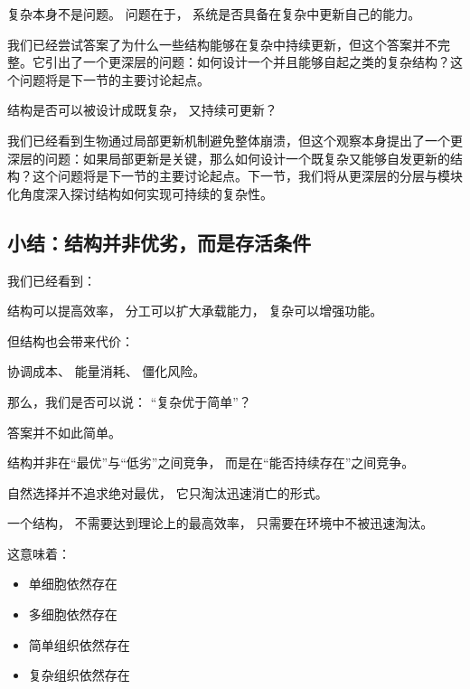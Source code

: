 \documentclass[openany, a4paper, 12pt]{book}
\begin{document}
\begin{readingnote}
	复杂本身不是问题。
	问题在于，
	系统是否具备在复杂中更新自己的能力。
\end{readingnote}

我们已经尝试答案了为什么一些结构能够在复杂中持续更新，但这个答案并不完整。它引出了一个更深层的问题：如何设计一个并且能够自起之类的复杂结构？这个问题将是下一节的主要讨论起点。

\begin{questionbox}
	结构是否可以被设计成既复杂，
	又持续可更新？
\end{questionbox}

我们已经看到生物通过局部更新机制避免整体崩溃，但这个观察本身提出了一个更深层的问题：如果局部更新是关键，那么如何设计一个既复杂又能够自发更新的结构？这个问题将是下一节的主要讨论起点。下一节，我们将从更深层的分层与模块化角度深入探讨结构如何实现可持续的复杂性。

\subsection*{小结：结构并非优劣，而是存活条件}


我们已经看到：

结构可以提高效率，
分工可以扩大承载能力，
复杂可以增强功能。

但结构也会带来代价：

协调成本、
能量消耗、
僵化风险。

那么，我们是否可以说：
“复杂优于简单”？

答案并不如此简单。

\begin{readingnote}
	结构并非在“最优”与“低劣”之间竞争，
	而是在“能否持续存在”之间竞争。
\end{readingnote}

自然选择并不追求绝对最优，
它只淘汰迅速消亡的形式。

一个结构，
不需要达到理论上的最高效率，
只需要在环境中不被迅速淘汰。

这意味着：

\begin{itemize}
	\item 单细胞依然存在
	\item 多细胞依然存在
	\item 简单组织依然存在
	\item 复杂组织依然存在
\end{itemize}
\end{document}
